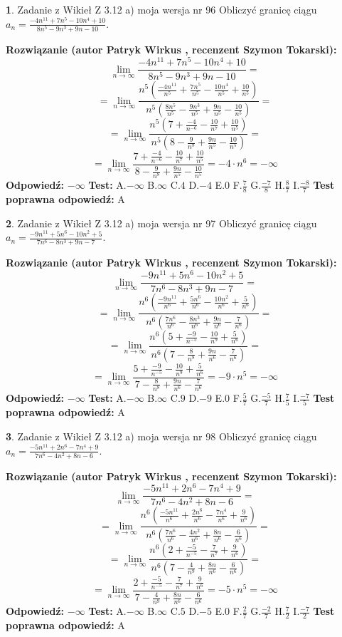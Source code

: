 \documentclass[12pt, a4paper]{article}
\theoremstyle{definition} %
\newtheorem{zad}{}
\newcommand{\zadStart}[1]{\begin{zad}#1\newline}
\newcommand{\zadStop}{\end{zad}}
\newcommand{\rozwStart}[2]{\noindent \textbf{Rozwiązanie (autor #1 , recenzent #2): }\newline}
\newcommand{\rozwStop}{\newline}
\newcommand{\odpStart}{\noindent \textbf{Odpowiedź:}\newline}
\newcommand{\odpStop}{\newline}
\newcommand{\testStart}{\noindent \textbf{Test:}\newline}
\newcommand{\testStop}{\newline}
\newcommand{\kluczStart}{\noindent \textbf{Test poprawna odpowiedź:}\newline}
\newcommand{\kluczStop}{\newline}
\begin{document}
\zadStart{Zadanie z Wikieł Z 3.12 a) moja wersja nr 96}
Obliczyć granicę ciągu $a_{n}=\frac{-4n^{11}+7n^{5}-10n^{4}+10}{8n^{5}-9n^{3}+9n-10}$.
\zadStop
\rozwStart{Patryk Wirkus}{Szymon Tokarski}
$$\lim\limits_{n\to\infty}\frac{-4n^{11}+7n^{5}-10n^{4}+10}{8n^{5}-9n^{3}+9n-10}=$$
$$=\lim\limits_{n\to\infty}\frac{n^{5}\left(\frac{-4n^{11}}{n^{5}}+\frac{7n^{5}}{n^{5}}-\frac{10n^{4}}{n^{5}}+\frac{10}{n^{5}}\right)}{n^{5}\left(\frac{8n^{5}}{n^{5}}-\frac{9n^{3}}{n^{5}}+\frac{9n}{n^{5}}-\frac{10}{n^{5}}\right)}=$$
$$=\lim\limits_{n\to\infty}\frac{n^{5}\left(7+\frac{-4}{n^{-6}}-\frac{10}{n^{7}}+\frac{10}{n^{5}}\right)}
{n^{5}\left(8-\frac{9}{n^{8}}+\frac{9n}{n^{5}}-\frac{10}{n^{5}}\right)}=$$
$$=\lim\limits_{n\to\infty}\frac{7+\frac{-4}{n^{-6}}-\frac{10}{n^{7}}+\frac{10}{n^{5}}}{8-\frac{9}{n^{8}}+\frac{9n}{n^{5}}-\frac{10}{n^{5}}}=-4\cdot n^{6} = -\infty$$
\rozwStop
\odpStart
$-\infty$
\odpStop
\testStart
A.$-\infty$
B.$\infty$
C.$4$
D.$-4$
E.$0$
F.$\frac{7}{8}$
G.$\frac{-7}{8}$
H.$\frac{8}{7}$
I.$\frac{-8}{7}$
\testStop
\kluczStart
A
\kluczStop



\zadStart{Zadanie z Wikieł Z 3.12 a) moja wersja nr 97}
Obliczyć granicę ciągu $a_{n}=\frac{-9n^{11}+5n^{6}-10n^{2}+5}{7n^{6}-8n^{3}+9n-7}$.
\zadStop
\rozwStart{Patryk Wirkus}{Szymon Tokarski}
$$\lim\limits_{n\to\infty}\frac{-9n^{11}+5n^{6}-10n^{2}+5}{7n^{6}-8n^{3}+9n-7}=$$
$$=\lim\limits_{n\to\infty}\frac{n^{6}\left(\frac{-9n^{11}}{n^{6}}+\frac{5n^{6}}{n^{6}}-\frac{10n^{2}}{n^{6}}+\frac{5}{n^{6}}\right)}{n^{6}\left(\frac{7n^{6}}{n^{6}}-\frac{8n^{3}}{n^{6}}+\frac{9n}{n^{6}}-\frac{7}{n^{6}}\right)}=$$
$$=\lim\limits_{n\to\infty}\frac{n^{6}\left(5+\frac{-9}{n^{-5}}-\frac{10}{n^{9}}+\frac{5}{n^{6}}\right)}
{n^{6}\left(7-\frac{8}{n^{8}}+\frac{9n}{n^{6}}-\frac{7}{n^{6}}\right)}=$$
$$=\lim\limits_{n\to\infty}\frac{5+\frac{-9}{n^{-5}}-\frac{10}{n^{9}}+\frac{5}{n^{6}}}{7-\frac{8}{n^{8}}+\frac{9n}{n^{6}}-\frac{7}{n^{6}}}=-9\cdot n^{5} = -\infty$$
\rozwStop
\odpStart
$-\infty$
\odpStop
\testStart
A.$-\infty$
B.$\infty$
C.$9$
D.$-9$
E.$0$
F.$\frac{5}{7}$
G.$\frac{-5}{7}$
H.$\frac{7}{5}$
I.$\frac{-7}{5}$
\testStop
\kluczStart
A
\kluczStop



\zadStart{Zadanie z Wikieł Z 3.12 a) moja wersja nr 98}
Obliczyć granicę ciągu $a_{n}=\frac{-5n^{11}+2n^{6}-7n^{4}+9}{7n^{6}-4n^{2}+8n-6}$.
\zadStop
\rozwStart{Patryk Wirkus}{Szymon Tokarski}
$$\lim\limits_{n\to\infty}\frac{-5n^{11}+2n^{6}-7n^{4}+9}{7n^{6}-4n^{2}+8n-6}=$$
$$=\lim\limits_{n\to\infty}\frac{n^{6}\left(\frac{-5n^{11}}{n^{6}}+\frac{2n^{6}}{n^{6}}-\frac{7n^{4}}{n^{6}}+\frac{9}{n^{6}}\right)}{n^{6}\left(\frac{7n^{6}}{n^{6}}-\frac{4n^{2}}{n^{6}}+\frac{8n}{n^{6}}-\frac{6}{n^{6}}\right)}=$$
$$=\lim\limits_{n\to\infty}\frac{n^{6}\left(2+\frac{-5}{n^{-5}}-\frac{7}{n^{7}}+\frac{9}{n^{6}}\right)}
{n^{6}\left(7-\frac{4}{n^{9}}+\frac{8n}{n^{6}}-\frac{6}{n^{6}}\right)}=$$
$$=\lim\limits_{n\to\infty}\frac{2+\frac{-5}{n^{-5}}-\frac{7}{n^{7}}+\frac{9}{n^{6}}}{7-\frac{4}{n^{9}}+\frac{8n}{n^{6}}-\frac{6}{n^{6}}}=-5\cdot n^{5} = -\infty$$
\rozwStop
\odpStart
$-\infty$
\odpStop
\testStart
A.$-\infty$
B.$\infty$
C.$5$
D.$-5$
E.$0$
F.$\frac{2}{7}$
G.$\frac{-2}{7}$
H.$\frac{7}{2}$
I.$\frac{-7}{2}$
\testStop
\kluczStart
A
\kluczStop
\end{document}

